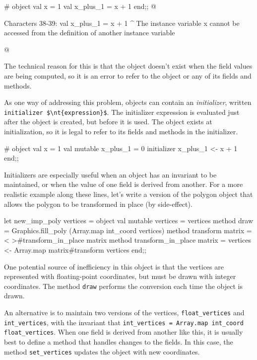 \begin{ocaml}
# object
     val x = 1
     val x_plus_1 = x + 1
  end;;
@
\begin{topoutput}
Characters 38-39:
     val x_plus_1 = x + 1
                    ^
The instance variable x
cannot be accessed from the definition of another instance variable
\end{topoutput}
@
\end{ocaml}
%
The technical reason for this is that the object doesn't exist when the field values are being
computed, so it is an error to refer to the object or any of its fields and methods.

\label{keyword:initializer}
As one way of addressing this problem, objects can contain an \emph{initializer}, written
\hbox{\lstinline/initializer $\nt{expression}$/}.
The initializer expression is evaluated just after the object is created, but before it is used.  The
object exists at initialization, so it is legal to refer to its fields and methods in the
initializer.

\begin{ocaml}
# object
     val x = 1
     val mutable x_plus_1 = 0
     initializer
        x_plus_1 <- x + 1
  end;;
\end{ocaml}
%
Initializers are especially useful when an object has an invariant to be maintained, or when the
value of one field is derived from another.  For a more realistic example along these lines, let's
write a version of the polygon object that allows the polygon to be transformed in place (by
side-effect).

\begin{ocaml}
let new_imp_poly vertices =
   object
      val mutable vertices = vertices
      method draw = Graphics.fill_poly (Array.map int_coord vertices)
      method transform matrix = {< >}#transform_in_place matrix
      method transform_in_place matrix =
         vertices <- Array.map matrix#transform vertices
   end;;
\end{ocaml}
%
One potential source of inefficiency in this object is that the vertices are represented with floating-point coordinates, but must be drawn with integer coordinates.  The method \hbox{\lstinline/draw/} performs the conversion each time the object is drawn.

An alternative is to maintain two versions of the vertices, \hbox{\lstinline/float_vertices/}
and \hbox{\lstinline/int_vertices/}, with the invariant that
\hbox{\lstinline/int_vertices = Array.map int_coord float_vertices/}.
When one field is derived from another like this, it is usually best to define a method that handles
changes to the fields.  In this case, the method \hbox{\lstinline/set_vertices/} updates the object with
new coordinates.

